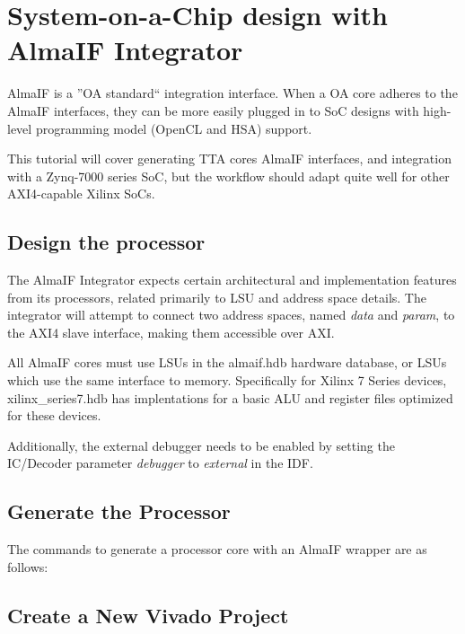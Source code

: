 \documentclass[a4paper,twoside]{tceusermanual}
\begin{document}
\section{System-on-a-Chip design with AlmaIF Integrator}

AlmaIF is a ''OA standard`` integration interface. When a OA core adheres
to the AlmaIF interfaces, they can be more easily plugged in to SoC designs with
high-level programming model (OpenCL and HSA) support.

This tutorial will cover generating TTA cores AlmaIF interfaces, and
integration with a Zynq-7000
series SoC, but the workflow should adapt quite well for other AXI4-capable
Xilinx SoCs.

\subsection{Design the processor}

The AlmaIF Integrator expects certain architectural and implementation features
from its processors, related primarily to LSU and address space details.
The integrator will attempt to connect two address spaces, named \textit{data}
and \textit{param}, to the AXI4 slave interface, making them accessible over
AXI.

All AlmaIF cores must use LSUs in the almaif.hdb hardware database, or LSUs
which use the same interface to memory. Specifically for Xilinx 7 Series
devices, xilinx\_series7.hdb has implentations for a basic ALU and register files
optimized for these devices.

Additionally, the external debugger needs to be enabled by setting the
IC/Decoder parameter \textit{debugger} to \textit{external} in the IDF.

\subsection{Generate the Processor}

The commands to generate a processor core with an AlmaIF wrapper are as follows:



\subsection{Create a New Vivado Project}
\end{document}
